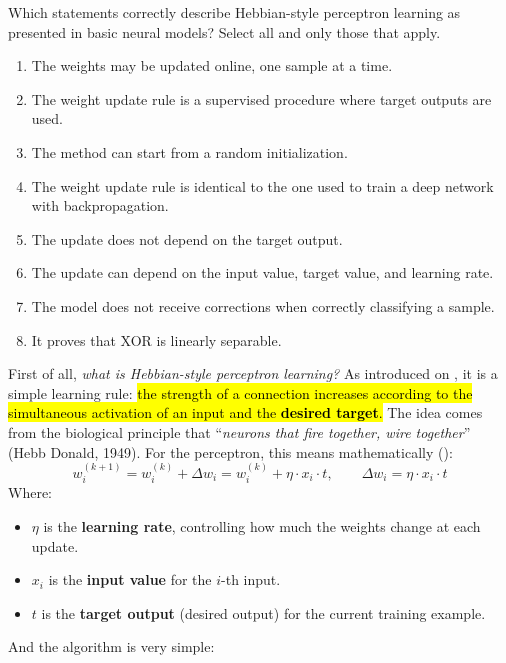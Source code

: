 \newpage

\noindent
\exercise[1.5] Which statements correctly describe Hebbian-style perceptron learning as presented in basic neural models? Select all and only those that apply.
\begin{enumerate}
    \item The weights may be updated online, one sample at a time.
    \item The weight update rule is a supervised procedure where target outputs are used.
    \item The method can start from a random initialization.
    \item The weight update rule is identical to the one used to train a deep network with backpropagation.
    \item The update does not depend on the target output.
    \item The update can depend on the input value, target value, and learning rate.
    \item The model does not receive corrections when correctly classifying a sample.
    \item It proves that XOR is linearly separable.
\end{enumerate}
\solution First of all, \emph{what is Hebbian-style perceptron learning?} As introduced on , it is a simple learning rule: \hl{the strength of a connection increases according to the simultaneous activation of an input and the \textbf{desired target}.} The idea comes from the biological principle that ``\emph{neurons that fire together, wire together}'' (Hebb Donald, 1949). For the perceptron, this means mathematically ():
\begin{equation*}
    w_{i}^{(k+1)} = w_i^{(k)} + \Delta w_i = w_i^{(k)} + \eta \cdot x_i \cdot t, \qquad \Delta w_i = \eta \cdot x_i \cdot t
\end{equation*}
Where:
\begin{itemize}
    \item $\eta$ is the \textbf{learning rate}, controlling how much the weights change at each update.
    \item $x_i$ is the \textbf{input value} for the $i$-th input.
    \item $t$ is the \textbf{target output} (desired output) for the current training example.
\end{itemize}
And the algorithm is very simple:
